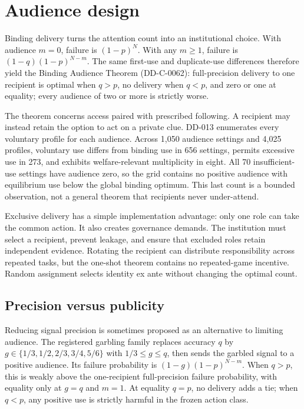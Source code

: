 \documentclass[11pt]{article}
\begin{document}
\section{Audience design}

Binding delivery turns the attention count into an institutional choice. With
audience $m=0$, failure is $(1-p)^N$. With any $m\geq1$, failure is
$(1-q)(1-p)^{N-m}$. The same first-use and duplicate-use differences therefore
yield the Binding Audience Theorem (DD-C-0062): full-precision delivery to one
recipient is optimal when $q>p$, no delivery when $q<p$, and zero or one at
equality; every audience of two or more is strictly worse.

The theorem concerns access paired with prescribed following. A recipient may
instead retain the option to act on a private clue. DD-013 enumerates every
voluntary profile for each audience. Across 1,050 audience settings and 4,025
profiles, voluntary use differs from binding use in 656 settings, permits
excessive use in 273, and exhibits welfare-relevant multiplicity in eight. All
70 insufficient-use settings have audience zero, so the grid contains no
positive audience with equilibrium use below the global binding optimum. This
last count is a bounded observation, not a general theorem that recipients
never under-attend.

Exclusive delivery has a simple implementation advantage: only one role can
take the common action. It also creates governance demands. The institution
must select a recipient, prevent leakage, and ensure that excluded roles retain
independent evidence. Rotating the recipient can distribute responsibility
across repeated tasks, but the one-shot theorem contains no repeated-game
incentive. Random assignment selects identity ex ante without changing the
optimal count.



\subsection{Precision versus publicity}

Reducing signal precision is sometimes proposed as an alternative to limiting
audience. The registered garbling family replaces accuracy $q$ by
$g\in\{1/3,1/2,2/3,3/4,5/6\}$ with $1/3\leq g\leq q$, then sends the garbled
signal to a positive audience. Its failure probability is
$(1-g)(1-p)^{N-m}$. When $q>p$, this is weakly above the one-recipient
full-precision failure probability, with equality only at $g=q$ and $m=1$.
At equality $q=p$, no delivery adds a tie; when $q<p$, any positive use is
strictly harmful in the frozen action class.
\end{document}
